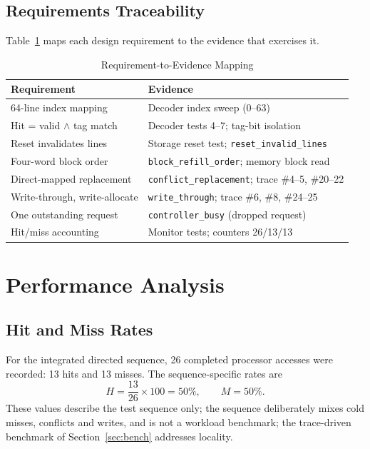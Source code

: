 \documentclass[conference,a4paper]{IEEEtran}
\begin{document}
\subsection{Requirements Traceability}\label{sec:trace2}
Table~\ref{tab:req} maps each design requirement to the evidence that exercises it.

\begin{table}[!t]
\caption{Requirement-to-Evidence Mapping}\label{tab:req}
\centering
\renewcommand{\arraystretch}{1.05}
\footnotesize
\begin{tabular}{@{}p{3.1cm}p{4.5cm}@{}}
\toprule
\textbf{Requirement} & \textbf{Evidence}\\
\midrule
64-line index mapping & Decoder index sweep (0--63)\\
Hit = valid $\wedge$ tag match & Decoder tests 4--7; tag-bit isolation\\
Reset invalidates lines & Storage reset test; \texttt{reset\_invalid\_lines}\\
Four-word block order & \texttt{block\_refill\_order}; memory block read\\
Direct-mapped replacement & \texttt{conflict\_replacement}; trace \#4--5, \#20--22\\
Write-through, write-allocate & \texttt{write\_through}; trace \#6, \#8, \#24--25\\
One outstanding request & \texttt{controller\_busy} (dropped request)\\
Hit/miss accounting & Monitor tests; counters 26/13/13\\
\bottomrule
\end{tabular}
\end{table}

\section{Performance Analysis}\label{sec:perf}
\subsection{Hit and Miss Rates}\label{sec:hit}
For the integrated directed sequence, 26 completed processor accesses were recorded: 13 hits and 13 misses. The sequence-specific rates are
\begin{equation}
H=\frac{13}{26}\times 100 = 50\%,\qquad M = 50\%.
\label{eq:hit_rate}
\end{equation}
These values describe the test sequence only; the sequence deliberately mixes cold misses, conflicts and writes, and is not a workload benchmark; the trace-driven benchmark of Section~\ref{sec:bench} addresses locality.
\end{document}
